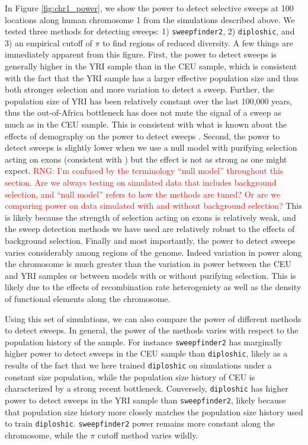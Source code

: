 \documentclass[hidelinks]{article}
\newcommand{\sweepfinder}{\texttt{sweepfinder2}\xspace}
\newcommand{\diploshic}{\texttt{diploshic}\xspace}
\newcommand{\rngcomment}[1]{\textcolor{red}{RNG: #1}}
\begin{document}
    In Figure \ref{fig:chr1_power}, we show the power to detect selective sweeps at 100 locations along human chromosome 1 from
    the simulations described above. We tested three methods for detecting sweeps: 1) \sweepfinder \citep{degiorgio2016sweepfinder2},
    2) \diploshic \citep{kern2018diplos}, and 3) an empirical cutoff of $\pi$ to find regions of reduced diversity.
    A few things are immediately apparent from this figure. First, the power to detect sweeps is generally higher in the YRI sample
    than in the CEU sample, which is consistent with the fact that the YRI sample has a larger effective population size and thus both stronger selection and
    more variation to detect a sweep. Further, the population size of YRI has been relatively constant over the last 100,000 years,
    thus the out-of-Africa bottleneck has does not mute the signal of a sweep as much as in the CEU sample. This is consistent with
    what is known about the effects of demography on the power to detect sweeps \citep[e.g.,][]{simonsen1995properties}.
    Second, the power to detect sweeps is slightly lower when we use a null model with purifying selection acting on exons (consistent with \cite{schrider2020background}) but the effect is not
    as strong as one might expect. 
    \rngcomment{I'm confused by the terminology ``null model'' throughout this section. Are we always testing on simulated data that includes background selection, and ``null model'' refers to how the methods are tuned? Or are we comparing power on data simulated with and without background selection?} This is likely because the strength of selection acting on exons is relatively weak, and the
    sweep detection methods we have used are relatively robust to the effects of background selection. 
    Finally and most importantly, the power to detect sweeps varies considerably among regions of the genome. 
    Indeed variation in power along the chromosome is much greater than the variation in power between the CEU and YRI samples or between
    models with or without purifying selection. This is likely due to the effects of recombination rate heterogeniety as well
    as the density of functional elements along the chromosome.

    Using this set of simulations, we can also compare the power of different methods to detect sweeps.
    In general, the power of the methods varies with respect to the population history of the sample.
    For instance \sweepfinder has marginally higher power to detect sweeps in the CEU sample than \diploshic,
    likely as a results of the fact that we here trained \diploshic on simulations under a constant size population,
    while the population size history of CEU is characterized by a strong recent bottleneck.
    Conversely, \diploshic has higher power to detect sweeps in the YRI sample than \sweepfinder,
    likely because that population size history more closely matches the population size history used to train \diploshic.
    \sweepfinder power remains more constant along the chromosome, while the $\pi$ cutoff method varies wildly. 
\end{document}
